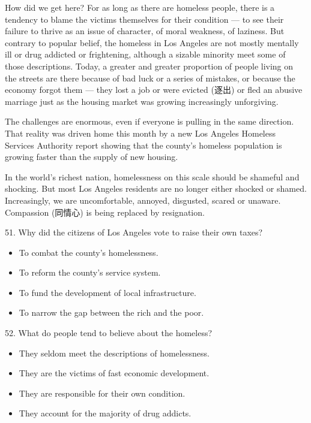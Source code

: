 \documentclass[UTF8,11pt]{ctexart}
\begin{document}
How did we get here? For as long as there are homeless people, there is a tendency to blame the victims themselves for their condition — to see their failure to thrive as an issue of character, of moral weakness, of laziness. But contrary to popular belief, the homeless in Los Angeles are not mostly mentally ill or drug addicted or frightening, although a sizable minority meet some of those descriptions. Today, a greater and greater proportion of people living on the streets are there because of bad luck or a series of mistakes, or because the economy forgot them — they lost a job or were evicted (逐出) or fled an abusive marriage just as the housing market was growing increasingly unforgiving.


The challenges are enormous, even if everyone is pulling in the same direction. That reality was driven home this month by a new Los Angeles Homeless Services Authority report showing that the county’s homeless population is growing faster than the supply of new housing.


In the world’s richest nation, homelessness on this scale should be shameful and shocking. But most Los Angeles residents are no longer either shocked or shamed. Increasingly, we are uncomfortable, annoyed, disgusted, scared or unaware. Compassion (同情心) is being replaced by resignation.


51. Why did the citizens of Los Angeles vote to raise their own taxes?


\begin{itemize}[leftmargin=2em,itemsep=.2em,topsep=.4em]\item[A.] To combat the county’s homelessness.
\item[B.] To reform the county’s service system.
\item[C.] To fund the development of local infrastructure.
\item[D.] To narrow the gap between the rich and the poor.
\end{itemize}

52. What do people tend to believe about the homeless?


\begin{itemize}[leftmargin=2em,itemsep=.2em,topsep=.4em]\item[A.] They seldom meet the descriptions of homelessness.
\item[B.] They are the victims of fast economic development.
\item[C.] They are responsible for their own condition.
\item[D.] They account for the majority of drug addicts.
\end{itemize}
\end{document}
